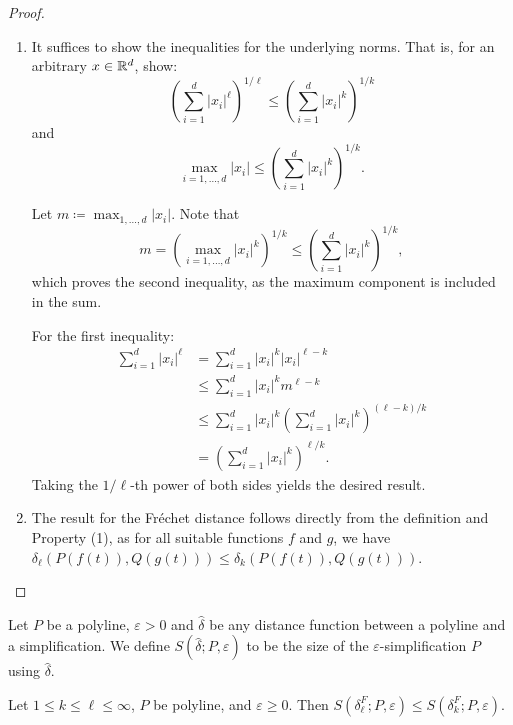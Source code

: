 \begin{proof}
  \begin{enumerate}
		\item It suffices to show the inequalities for the underlying norms. That is, for an arbitrary \(x \in \mathbb{R}^d\), show:
			\[\left(\sum_{i=1}^d |x_i|^\ell\right)^{1/\ell} \leq \left(\sum_{i=1}^d |x_i|^k\right)^{1/k}\]
			and
			\[\max_{i=1, \dots, d} |x_i| \leq \left(\sum_{i=1}^d |x_i|^k\right)^{1/k}.\]

			Let \(m \coloneq \max_{1,\dots, d}|x_i|\). Note that
			\[m = \left(\max_{i=1, \dots, d} |x_i|^{k}\right)^{1/k} \leq \left(\sum_{i=1}^d |x_i|^{k}\right)^{1/k},\]
			which proves the second inequality, as the maximum component is included in the sum.

			For the first inequality:
			\begin{align*}
				\sum_{i=1}^d |x_i|^\ell &= \sum_{i=1}^d |x_i|^k|x_i|^{\ell - k} \\
				 &\leq \sum_{i=1}^d |x_i|^k m^{\ell - k} \\
				 &\leq \sum_{i=1}^d |x_i|^k \left(\sum_{i=1}^d |x_i|^{k}\right)^{(\ell-k)/k} \\
				 &= \left(\sum_{i=1}^d |x_i|^{k}\right)^{\ell/k}.
			\end{align*}
			Taking the \(1/\ell\)-th power of both sides yields the desired result.
		\item The result for the Fréchet distance follows directly from the definition and Property (1), as for all suitable functions \(f\) and \(g\), we have \(\delta_\ell(P(f(t)), Q(g(t))) \leq \delta_k(P(f(t)), Q(g(t)))\).
  \end{enumerate}
\end{proof}

\begin{definition}
	Let \(P\) be a polyline, \(\varepsilon > 0\) and \(\hat \delta\) be any distance function between a polyline and a simplification. We define \(S(\hat \delta; P, \varepsilon)\) to be the size of the \(\varepsilon\)-simplification \(P\) using \(\hat \delta\).
\end{definition}

\begin{corollary}\label{cor:size_monotonicity}
	Let \(1 \leq k \leq \ell \leq \infty\),
	\(P\) be polyline, and \(\varepsilon \geq 0\). Then \(S(\delta^F_\ell; P, \varepsilon) \leq S(\delta_k^F; P, \varepsilon)\).
\end{corollary}

